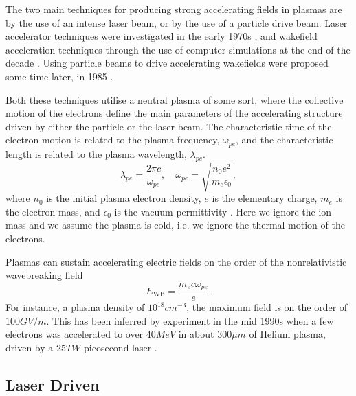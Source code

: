 The two main techniques for producing strong accelerating fields in plasmas are by the use of an intense laser beam, or by the use of a particle drive beam. Laser accelerator techniques were investigated in the early 1970s \cite{chan:1971, palmer:1972}, and wakefield acceleration techniques through the use of computer simulations at the end of the decade \cite{tajima:1979}. Using particle beams to drive accelerating wakefields were proposed some time later, in 1985 \cite{chen:1985}.

Both these techniques utilise a neutral plasma of some sort, where the collective motion of the electrons define the main parameters of the accelerating structure driven by either the particle or the laser beam. The characteristic time of the electron motion is related to the plasma frequency, $\omega_{pe}$, and the characteristic length is related to the plasma wavelength, $\lambda_{pe}$.
\begin{equation}
    \lambda_{pe} = \frac{2\pi c}{\omega_{pe}}, \quad
    \omega_{pe}  = \sqrt{\frac{n_{0}e^{2}}{m_{e}\epsilon_{0}}}, \label{EQ:PWFA:L0W0}
\end{equation}
where $n_{0}$ is the initial plasma electron density, $e$ is the elementary charge, $m_{e}$ is the electron mass, and $\epsilon_{0}$ is the vacuum permittivity \cite{tonks:1929, esarey:1996, pecseli:2012}. Here we ignore the ion mass and we assume the plasma is cold, i.e. we ignore the thermal motion of the electrons.

Plasmas can sustain accelerating electric fields on the order of the nonrelativistic wavebreaking field \cite{dawson:1959, esarey:1996}
\begin{equation}
    E_{\mathrm{WB}} = \frac{m_{e} c \omega_{pe}}{e}. \label{EQ:EWB}
\end{equation}
For instance, a plasma density of $10^{18}\unit{cm}^{-3}$, the maximum field is on the order of $100\unit{GV/m}$. This has been inferred by experiment in the mid 1990s when a few electrons was accelerated to over $40\unit{MeV}$ in about $300\unit{\mu m}$ of Helium plasma, driven by a $25\unit{TW}$ picosecond laser \cite{modena:1995}.



\subsection{Laser Driven}
\label{Int:LWFA}

